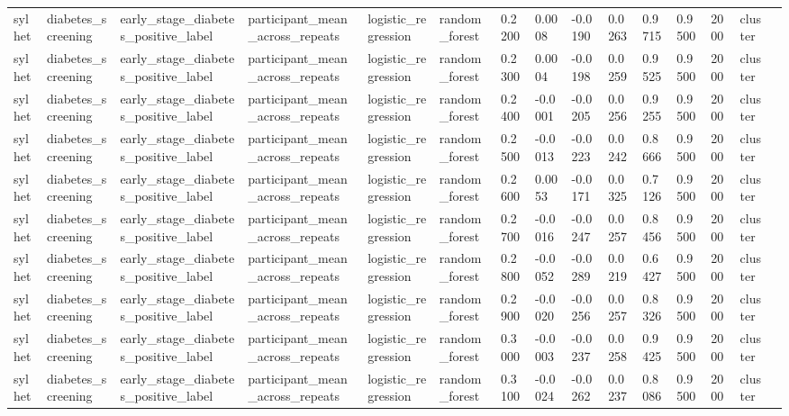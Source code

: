 \begin{tabular}{lllllllllllllll}
sylhet & diabetes\_screening & early\_stage\_diabetes\_positive\_label & participant\_mean\_across\_repeats & logistic\_regression & random\_forest & 0.2200 & 0.0008 & -0.0190 & 0.0263 & 0.9715 & 0.9500 & 2000 & cluster &  \\
sylhet & diabetes\_screening & early\_stage\_diabetes\_positive\_label & participant\_mean\_across\_repeats & logistic\_regression & random\_forest & 0.2300 & 0.0004 & -0.0198 & 0.0259 & 0.9525 & 0.9500 & 2000 & cluster &  \\
sylhet & diabetes\_screening & early\_stage\_diabetes\_positive\_label & participant\_mean\_across\_repeats & logistic\_regression & random\_forest & 0.2400 & -0.0001 & -0.0205 & 0.0256 & 0.9255 & 0.9500 & 2000 & cluster &  \\
sylhet & diabetes\_screening & early\_stage\_diabetes\_positive\_label & participant\_mean\_across\_repeats & logistic\_regression & random\_forest & 0.2500 & -0.0013 & -0.0223 & 0.0242 & 0.8666 & 0.9500 & 2000 & cluster &  \\
sylhet & diabetes\_screening & early\_stage\_diabetes\_positive\_label & participant\_mean\_across\_repeats & logistic\_regression & random\_forest & 0.2600 & 0.0053 & -0.0171 & 0.0325 & 0.7126 & 0.9500 & 2000 & cluster &  \\
sylhet & diabetes\_screening & early\_stage\_diabetes\_positive\_label & participant\_mean\_across\_repeats & logistic\_regression & random\_forest & 0.2700 & -0.0016 & -0.0247 & 0.0257 & 0.8456 & 0.9500 & 2000 & cluster &  \\
sylhet & diabetes\_screening & early\_stage\_diabetes\_positive\_label & participant\_mean\_across\_repeats & logistic\_regression & random\_forest & 0.2800 & -0.0052 & -0.0289 & 0.0219 & 0.6427 & 0.9500 & 2000 & cluster &  \\
sylhet & diabetes\_screening & early\_stage\_diabetes\_positive\_label & participant\_mean\_across\_repeats & logistic\_regression & random\_forest & 0.2900 & -0.0020 & -0.0256 & 0.0257 & 0.8326 & 0.9500 & 2000 & cluster &  \\
sylhet & diabetes\_screening & early\_stage\_diabetes\_positive\_label & participant\_mean\_across\_repeats & logistic\_regression & random\_forest & 0.3000 & -0.0003 & -0.0237 & 0.0258 & 0.9425 & 0.9500 & 2000 & cluster &  \\
sylhet & diabetes\_screening & early\_stage\_diabetes\_positive\_label & participant\_mean\_across\_repeats & logistic\_regression & random\_forest & 0.3100 & -0.0024 & -0.0262 & 0.0237 & 0.8086 & 0.9500 & 2000 & cluster &  \\

\end{tabular}
